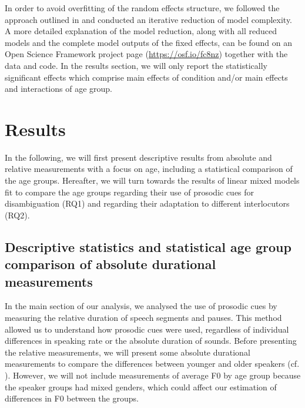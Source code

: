 \documentclass[output=paper]{langscibook}
\begin{document}
In order to avoid overfitting of the random effects structure, we followed the approach outlined in \citet{bates_parsimonious_2015} and conducted an iterative reduction of model complexity. A more detailed explanation of the model reduction, along with all reduced models and the complete model outputs of the fixed effects, can be found on an Open Science Framework project page (\href{https://osf.io/fc8nz/?view_only=1974f7d0721049e2be0401c973234518}{https://osf.io/fc8nz}) together with the data and code. In the results section, we will only report the statistically significant effects which comprise main effects of condition and/or main effects and interactions of age group.

\section{Results}
In the following, we will first present descriptive results from absolute and relative measurements with a focus on age, including a statistical comparison of the age groups. Hereafter, we will turn towards the results of linear mixed models fit to compare the age groups regarding their use of prosodic cues for disambiguation (RQ1) and regarding their adaptation to different interlocutors (RQ2).

\subsection{Descriptive statistics and statistical age group comparison of absolute durational measurements}
In the main section of our analysis, we analysed the use of prosodic cues by measuring the relative duration of speech segments and pauses. This method allowed us to understand how prosodic cues were used, regardless of individual differences in speaking rate or the absolute duration of sounds. Before presenting the relative measurements, we will present some absolute durational measurements to compare the differences between younger and older speakers (cf. ). However, we will not include measurements of average F0 by age group because the speaker groups had mixed genders, which could affect our estimation of differences in F0 between the groups. 
\end{document}
